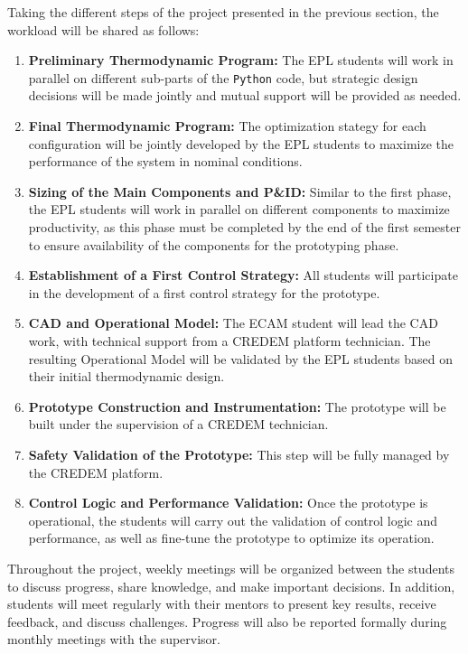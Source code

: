 Taking the different steps of the project presented in the previous section, 
the workload will be shared as follows:

\begin{enumerate}
\item \textbf{Preliminary Thermodynamic Program:} The EPL students will work 
in parallel on different sub-parts of the \texttt{Python} code, but strategic 
design decisions will be made jointly and mutual support will be provided as needed.
\item \textbf{Final Thermodynamic Program:} The optimization stategy for each configuration will be 
jointly developed by the EPL students to maximize the performance of the system in 
nominal conditions.
\item \textbf{Sizing of the Main Components and P\&ID:} Similar to the first phase, 
the EPL students will work in parallel on different components to maximize 
productivity, as this phase must be completed by the end of the first semester 
to ensure availability of the components for the prototyping phase.
\item \textbf{Establishment of a First Control Strategy:} All students will participate in the
development of a first control strategy for the prototype.
\item \textbf{CAD and Operational Model:} The ECAM student will lead the CAD work, 
with technical support from a CREDEM platform technician. The resulting Operational 
Model will be validated by the EPL students based on their initial thermodynamic design.
\item \textbf{Prototype Construction and Instrumentation:} The prototype will be built 
under the supervision of a CREDEM technician.
\item \textbf{Safety Validation of the Prototype:} This step will be fully managed 
by the CREDEM platform.
\item \textbf{Control Logic and Performance Validation:} Once the prototype is 
operational, the students will carry out the validation of control logic and 
performance, as well as fine-tune the prototype to optimize its operation.
\end{enumerate}

\noindent Throughout the project, weekly meetings will be organized between 
the students to discuss progress, share knowledge, and make important decisions. 
In addition, students will meet regularly with their mentors to present key results, 
receive feedback, and discuss challenges. Progress will also be reported formally 
during monthly meetings with the supervisor.